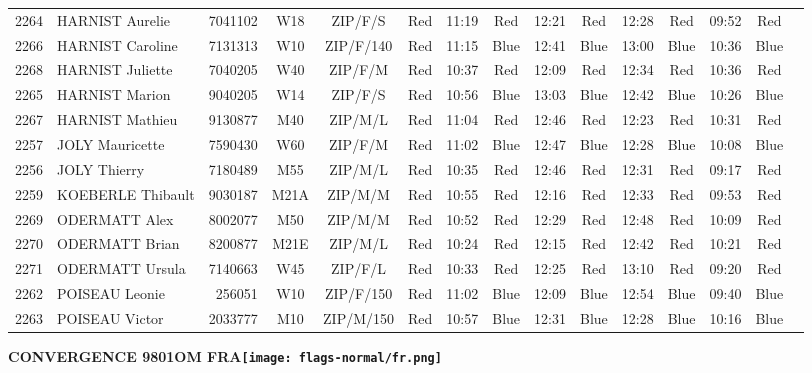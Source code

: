 \documentclass{report}
\begin{document}
\begin{longtable}{|c|l|r|c|c|*{5}{cc|}}
    2264 & HARNIST Aurelie & 7041102 & W18 & ZIP/F/S & Red & 11:19 & Red & 12:21 & Red & 12:28 & Red & 09:52 & Red &  \\
    2266 & HARNIST Caroline & 7131313 & W10 & ZIP/F/140 & Red & 11:15 & Blue & 12:41 & Blue & 13:00 & Blue & 10:36 & Blue &  \\
    2268 & HARNIST Juliette & 7040205 & W40 & ZIP/F/M & Red & 10:37 & Red & 12:09 & Red & 12:34 & Red & 10:36 & Red &  \\
    2265 & HARNIST Marion & 9040205 & W14 & ZIP/F/S & Red & 10:56 & Blue & 13:03 & Blue & 12:42 & Blue & 10:26 & Blue &  \\
    2267 & HARNIST Mathieu & 9130877 & M40 & ZIP/M/L & Red & 11:04 & Red & 12:46 & Red & 12:23 & Red & 10:31 & Red &  \\
    2257 & JOLY Mauricette & 7590430 & W60 & ZIP/F/M & Red & 11:02 & Blue & 12:47 & Blue & 12:28 & Blue & 10:08 & Blue &  \\
    2256 & JOLY Thierry & 7180489 & M55 & ZIP/M/L & Red & 10:35 & Red & 12:46 & Red & 12:31 & Red & 09:17 & Red &  \\
    2259 & KOEBERLE Thibault & 9030187 & M21A & ZIP/M/M & Red & 10:55 & Red & 12:16 & Red & 12:33 & Red & 09:53 & Red &  \\
    2269 & ODERMATT Alex & 8002077 & M50 & ZIP/M/M & Red & 10:52 & Red & 12:29 & Red & 12:48 & Red & 10:09 & Red &  \\
    2270 & ODERMATT Brian & 8200877 & M21E & ZIP/M/L & Red & 10:24 & Red & 12:15 & Red & 12:42 & Red & 10:21 & Red &  \\
    2271 & ODERMATT Ursula & 7140663 & W45 & ZIP/F/L & Red & 10:33 & Red & 12:25 & Red & 13:10 & Red & 09:20 & Red &  \\
    2262 & POISEAU Leonie & 256051 & W10 & ZIP/F/150 & Red & 11:02 & Blue & 12:09 & Blue & 12:54 & Blue & 09:40 & Blue &  \\
    2263 & POISEAU Victor & 2033777 & M10 & ZIP/M/150 & Red & 10:57 & Blue & 12:31 & Blue & 12:28 & Blue & 10:16 & Blue &  \\
  \end{longtable}
\newpage
  \Huge \centering \bfseries CONVERGENCE 9801OM FRA\normalfont \footnotesize \sffamily \hfill \texttt{[image: flags-normal/fr.png]} \newline 
\end{document}
